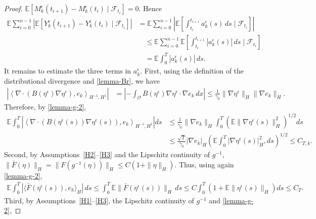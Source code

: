 \documentclass[11pt]{article}
\theoremstyle{plain}
\numberwithin{equation}{section}
\begin{document}
\begin{proof}
\(\mathbb E\left[ M_k^\epsilon(t_{i+1})-M_k^\epsilon(t_i)\mid \mathcal F_{t_i}\right]=0 .\)
Hence
\[
\begin{aligned}
\mathbb E\sum_{i=0}^{n-1}\left|\mathbb E\left[Y_k^\epsilon(t_{i+1})-Y_k^\epsilon(t_i)\mid \mathcal F_{t_i}\right]\right|  
 &= \mathbb E\sum_{i=0}^{n-1}\left|\mathbb E\left[\int_{t_i}^{t_{i+1}} a_k^\epsilon(s)\,ds\mid \mathcal F_{t_i}\right]\right|          \\
&\quad \le \mathbb E\sum_{i=0}^{n-1}\mathbb E\left[\int_{t_i}^{t_{i+1}} |a_k^\epsilon(s)|\,ds\mid \mathcal F_{t_i}\right]   \\
&\quad = \mathbb E\int_0^T |a_k^\epsilon(s)|\,ds .
\end{aligned}
\]
It remains to estimate the three terms in \(a_k^\epsilon\). First, using the definition of the distributional divergence and
\eqref{lemma-Br}, we have
\[
\begin{aligned}
\left|\left\langle\nabla\cdot\left(B(\eta^\epsilon)\nabla\eta^\epsilon\right),e_k\right\rangle_{H^{-1},H^1}\right|
&=\left|-\int_{\mathcal O}B(\eta^\epsilon)\nabla\eta^\epsilon\cdot\nabla e_k\,dx\right|                                                
\le\frac1{\gamma_0}\|\nabla\eta^\epsilon\|_H\|\nabla e_k\|_H .\end{aligned}
\]
Therefore, by \eqref{lemma-g-2},
\[
\begin{aligned}
 \mathbb E\int_0^T\left|\left\langle\nabla\cdot\left(B(\eta^\epsilon(s))\nabla\eta^\epsilon(s)\right),e_k\right\rangle_{H^{-1},H^1}\right|ds                                          
 &  \le\frac1{\gamma_0}\|\nabla e_k\|_H\int_0^T\left(\mathbb E\|\nabla\eta^\epsilon(s)\|_H^2\right)^{1/2}ds\\
&\leq\frac{\sqrt{T}}{\gamma_0}|\nabla e_k|_H\left(\mathbb E\int_0^T|\nabla\eta^\epsilon(s)|_H^2,ds\right)^{1/2} \le C_{T,k}.
\end{aligned}
\]
Second, by Assumptions~\ref{H2}--\ref{H3} and the Lipschitz continuity of \(g^{-1}\), \(\|\bar F(\eta)\|_H=\|F(g^{-1}(\eta))\|_H\le C(1+\|\eta\|_H).\)
Thus, using again \eqref{lemma-g-2},
\[
\begin{aligned}
\mathbb E\int_0^T |\langle \bar F(\eta^\epsilon(s)),e_k\rangle_H|\,ds\le\int_0^T\mathbb E\|\bar F(\eta^\epsilon(s))\|_H\,ds        
\le C\int_0^T\left(1+\mathbb E\|\eta^\epsilon(s)\|_H\right)ds \le C_T .
\end{aligned}
\]
Third, by Assumptions~\ref{H1}--\ref{H3},  the Lipschitz continuity of \(g^{-1}\) and  \eqref{lemma-g-2},

\end{proof}
\end{document}
